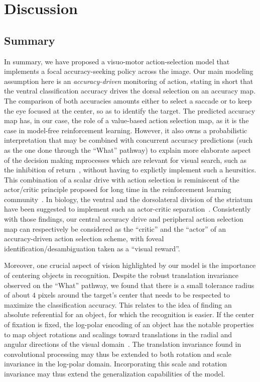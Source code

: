 \section{Discussion} \label{sec:discussion}
\subsection{Summary}

In summary, we have proposed a visuo-motor action-selection model that implements a focal accuracy-seeking policy across the image. Our main modeling assumption here is an \emph{accuracy-driven} monitoring of action, stating in short that the ventral classification accuracy drives the dorsal selection on an accuracy map. The comparison of both accuracies amounts either to select a saccade or to keep the eye focused at the center, so as to identify the target. The predicted accuracy map has, in our case, the role of a value-based action selection map, as it is the case in model-free reinforcement learning. However, it also owns a probabilistic interpretation that may be combined with concurrent accuracy predictions (such as the one done through the ``What'' pathway) to explain more elaborate aspect of the decision making mprocesses which are relevant for visual search, such as the inhibition of return~\cite{Itti01}, without having to explictly implement such a heursitics. This combination of a scalar drive with action selection is reminiscent of the actor/critic principle proposed for long time in the reinforcement learning community~\cite{sutton1998reinforcement}. In biology, the ventral and the dorsolateral division of the striatum have been suggested to implement such an actor-critic separation~\cite{joel2002actor, takahashi2008silencing}. Consistently with those findings, our central accuracy drive and peripheral action selection map can respectively be considered as the ``critic'' and the ``actor'' of an accuracy-driven action selection scheme, with foveal identification/desambiguation taken as a ``visual reward''.

Moreover, one crucial aspect of vision highlighted by our model is the importance of centering objects in recognition. Despite the robust translation invariance observed on the ``What'' pathway, we found that there is a small tolerance radius of about $4$ pixels around the target's center that needs to be respected to maximize the classification accuracy. This relates to the idea of finding an absolute referential for an object, for which the recognition is easier. If the center of fixation is fixed, the log-polar encoding of an object has the notable properties to map object rotations and scalings toward translations in the radial and angular directions of the visual domain~\cite{Traver10}. The translation invariance found in convolutional processing may thus be extended to both rotation and scale invariance in the log-polar domain. Incorporating this scale and rotation invariance may thus extend the generalization capabilities of the model.


